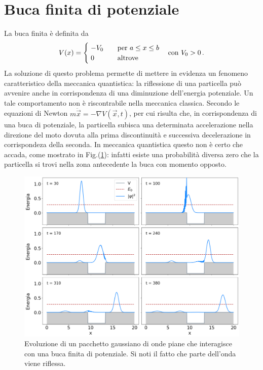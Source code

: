\documentclass[12pt]{report}
\begin{document}
\section{Buca finita di potenziale}
\label{sec:finite_hole}

La buca finita è definita da
\begin{equation}
    \centering
    V(x) =
    \begin{cases}
        \; -V_0  \quad &\text{per  } a \le x \le b  \\
        \; 0 \qquad &\text{altrove}      
    \end{cases} 
    \quad \text{con  } V_0 > 0 \, \text{.}
\end{equation}
La soluzione di questo problema permette di mettere in evidenza un fenomeno caratteristico della meccanica quantistica: la riflessione di una particella può avvenire anche in corrispondenza di una diminuzione dell'energia potenziale. 
Un tale comportamento non è riscontrabile nella meccanica classica. Secondo le equazioni di Newton $m \ddot{\vec{x}} = -\nabla V(\vec{x}, t)$, per cui risulta che, in corrispondenza di una buca di potenziale, la particella subisca una determinata accelerazione nella direzione del moto dovuta alla prima discontinuità e successiva decelerazione in corrispondeza della seconda. In meccanica quantistica questo non è certo che accada, come mostrato in Fig.(\ref{fig:finite_hole}): infatti esiste una probabilità diversa zero che la particella si trovi nella zona antecedente la buca con momento opposto.

\begin{figure}
    \centering
    \includegraphics[width = \textwidth]{immagini/hole.png}
    \caption{ \textcolor{dark-gray}{Evoluzione di un pacchetto gaussiano di onde piane che interagisce con una buca finita di potenziale. Si noti il fatto che parte dell'onda viene riflessa.}}
    \label{fig:finite_hole}
\end{figure}
\end{document}
